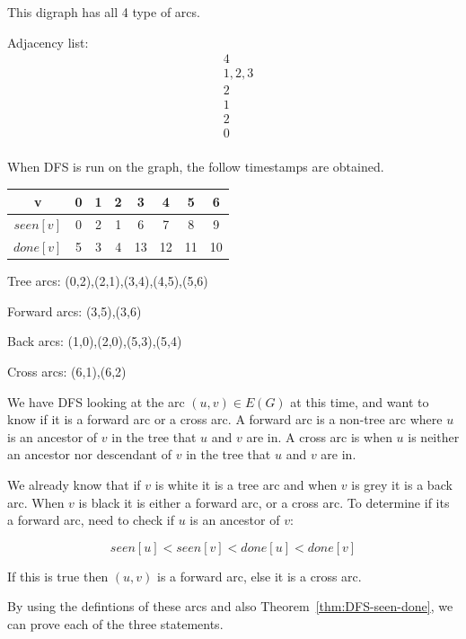 This digraph has all 4 type of arcs.

Adjacency list:
\begin{align*}
& 4 \\
& 1,2,3 \\
& 2 \\
& 1 \\
& 2 \\
& 0 \\
\end{align*}
\fi

When DFS is run on the graph, the follow timestamps are obtained.

\begin{center}
\begin{tabular}{|c|c|c|c|c|c|c|c|}
\hline
v& 0& 1& 2& 3& 4& 5& 6 \\
\hline
\(seen[v]\)& 0& 2& 1& 6& 7& 8& 9 \\
\hline
\(done[v]\)& 5& 3& 4& 13& 12& 11& 10 \\
\hline
\end{tabular}
\end{center}

Tree arcs:
(0,2),(2,1),(3,4),(4,5),(5,6)

Forward arcs:
(3,5),(3,6)

Back arcs:
(1,0),(2,0),(5,3),(5,4)

Cross arcs:
(6,1),(6,2)



We have DFS looking at the arc \((u,v)\in E(G)\) at this time, and
want to know if it is a forward arc or a cross arc. A forward arc
is a non-tree arc where \(u\) is an ancestor of \(v\) in the tree
that \(u\) and \(v\) are in. A cross arc is when \(u\) is neither
an ancestor nor descendant of \(v\) in the tree that \(u\) and \(v\)
are in.

We already know that if \(v\) is white it is a tree arc and when
\(v\) is grey it is a back arc. When \(v\) is black it is either a
forward arc, or a cross arc. To determine if its a forward arc,
need to check if \(u\) is an ancestor of \(v\):

\[seen[u] < seen[v] < done[u] < done[v]\]

If this is true then \((u,v)\) is a forward arc, else it is a cross arc.

\fi

By using the defintions of these arcs
and also Theorem~\ref{thm:DFS-seen-done}, we can prove each of the three statements.                      

